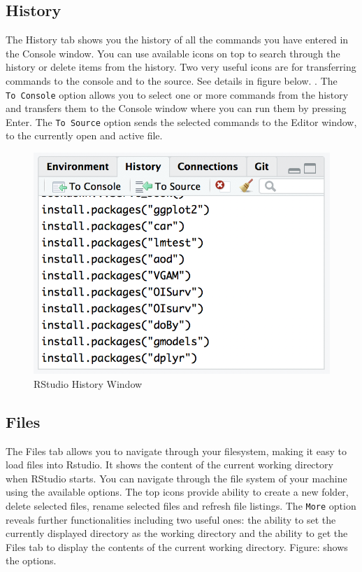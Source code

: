 \documentclass[]{krantz}
\theoremstyle{definition}
\theoremstyle{definition}
\theoremstyle{definition}
\theoremstyle{remark}
\begin{document}
\subsection{History}\label{history}

The History tab shows you the history of all the commands you have
entered in the Console window. You can use available icons on top to
search through the history or delete items from the history. Two very
useful icons are for transferring commands to the console and to the
source. See details in figure below. . The \texttt{To\ Console} option
allows you to select one or more commands from the history and transfers
them to the Console window where you can run them by pressing Enter. The
\texttt{To\ Source} option sends the selected commands to the Editor
window, to the currently open and active file.

\begin{figure}

{\centering \includegraphics[width=0.5\linewidth]{images/history} 

}

\caption{RStudio History Window}\label{fig:unnamed-chunk-5}
\end{figure}

\subsection{Files}\label{files}

The Files tab allows you to navigate through your filesystem, making it
easy to load files into Rstudio. It shows the content of the current
working directory when RStudio starts. You can navigate through the file
system of your machine using the available options. The top icons
provide ability to create a new folder, delete selected files, rename
selected files and refresh file listings. The \texttt{More} option
reveals further functionalities including two useful ones: the ability
to set the currently displayed directory as the working directory and
the ability to get the Files tab to display the contents of the current
working directory. Figure: shows the options.
\end{document}
